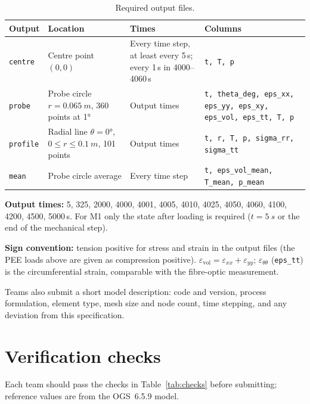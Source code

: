 \documentclass[11pt,a4paper]{article}
\begin{document}
\begin{table}[htbp]
\centering
\caption{Required output files.}
\label{tab:outputs}
\small
\begin{tabularx}{\textwidth}{@{}lLLL@{}}
\toprule
Output & Location & Times & Columns \\
\midrule
\texttt{centre}  & Centre point $(0,0)$ & Every time step, at least every 5\,s; every 1\,s in 4000--4060\,s & \texttt{t, T, p} \\
\texttt{probe}   & Probe circle $r=\SI{0.065}{m}$, 360 points at \ang{1} & Output times & \texttt{t, theta\_deg, eps\_xx, eps\_yy, eps\_xy, eps\_vol, eps\_tt, T, p} \\
\texttt{profile} & Radial line $\theta=\ang{0}$, $0\le r\le\SI{0.1}{m}$, 101 points & Output times & \texttt{t, r, T, p, sigma\_rr, sigma\_tt} \\
\texttt{mean}    & Probe circle average & Every time step & \texttt{t, eps\_vol\_mean, T\_mean, p\_mean} \\
\bottomrule
\end{tabularx}
\end{table}

\textbf{Output times:} 5, 325, 2000, 4000, 4001, 4005, 4010, 4025, 4050, 4060,
4100, 4200, 4500, 5000\,s. For M1 only the state after loading is required
($t=\SI{5}{s}$ or the end of the mechanical step).

\textbf{Sign convention:} tension positive for stress and strain in the output
files (the PEE loads above are given as compression positive).
$\varepsilon_\mathrm{vol}=\varepsilon_{xx}+\varepsilon_{yy}$;
$\varepsilon_{\theta\theta}$ (\texttt{eps\_tt}) is the circumferential strain,
comparable with the fibre-optic measurement.

Teams also submit a short model description: code and version, process
formulation, element type, mesh size and node count, time stepping, and any
deviation from this specification.

\section{Verification checks}
\label{sec:verification}
Each team should pass the checks in Table~\ref{tab:checks} before submitting;
reference values are from the OGS~6.5.9 model.
\end{document}
